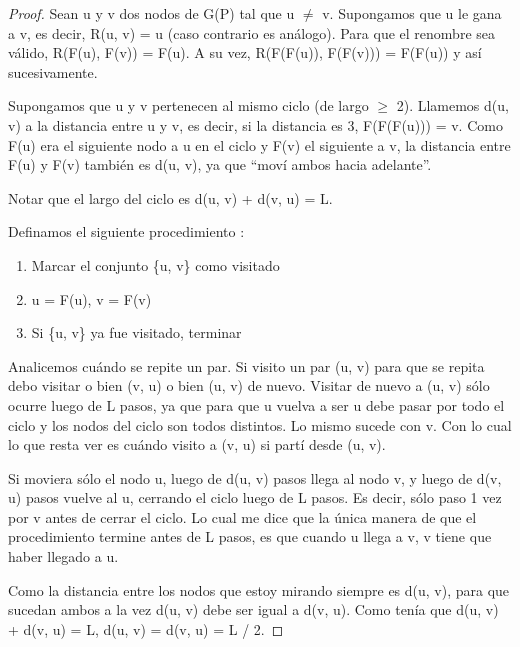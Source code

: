 \begin{proof}
	Sean u y v dos nodos de G(P) tal que u $\neq$ v. Supongamos que u le gana a v, es decir, R(u, v) = u (caso contrario es análogo). Para que el renombre sea válido, R(F(u), F(v)) = F(u). A su vez, R(F(F(u)), F(F(v))) = F(F(u)) y así sucesivamente. \newline

	Supongamos que u y v pertenecen al mismo ciclo (de largo $\geq$ 2). Llamemos d(u, v) a la distancia entre u y v, es decir, si la distancia es 3, F(F(F(u))) = v. Como F(u) era el siguiente nodo a u en el ciclo y F(v) el siguiente a v, la distancia entre F(u) y F(v) también es d(u, v), ya que ``moví ambos hacia adelante''. \newline

	Notar que el largo del ciclo es d(u, v) + d(v, u) = L.

	Definamos el siguiente procedimiento : \newline

	\begin{enumerate}
		\item{Marcar el conjunto \{u, v\} como visitado}
		\item{u = F(u), v = F(v)}
		\item{Si \{u, v\} ya fue visitado, terminar}
	\end{enumerate}

	Analicemos cuándo se repite un par. Si visito un par (u, v) para que se repita debo visitar o bien (v, u) o bien (u, v) de nuevo. Visitar de nuevo a (u, v) sólo ocurre luego de L pasos, ya que para que u vuelva a ser u debe pasar por todo el ciclo y los nodos del ciclo son todos distintos. Lo mismo sucede con v. Con lo cual lo que resta ver es cuándo visito a (v, u) si partí desde (u, v). \newline

	Si moviera sólo el nodo u, luego de d(u, v) pasos llega al nodo v, y luego de d(v, u) pasos vuelve al u, cerrando el ciclo luego de L pasos. Es decir, sólo paso 1 vez por v antes de cerrar el ciclo. Lo cual me dice que la única manera de que el procedimiento termine antes de L pasos, es que cuando u llega a v, v tiene que haber llegado a u. \newline

	Como la distancia entre los nodos que estoy mirando siempre es d(u, v), para que sucedan ambos a la vez d(u, v) debe ser igual a d(v, u). Como tenía que d(u, v) + d(v, u) = L, d(u, v) = d(v, u) = L / 2. \newline


\end{proof}
